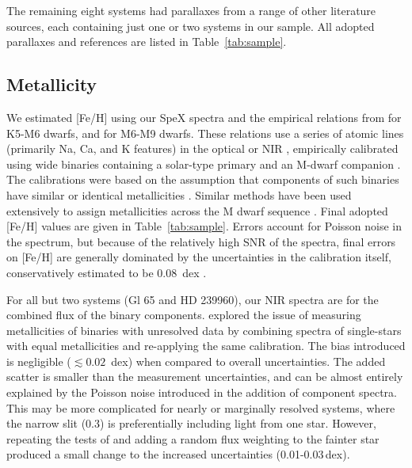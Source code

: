 \documentclass[twocolumn]{aastex62}
\begin{document}
The remaining eight systems had parallaxes from a range of other literature sources, each containing just one or two systems in our sample. All adopted parallaxes and references are listed in Table~\ref{tab:sample}.

\subsection{Metallicity}\label{sec:feh}

We estimated [Fe/H] using our SpeX spectra and the empirical relations from \citet{Mann2013a} for K5-M6 dwarfs, and \citet{Mann2014} for M6-M9 dwarfs. These relations use a series of atomic lines (primarily Na, Ca, and K features) in the optical or NIR \citep[e.g.,][]{2010ApJ...720L.113R,Terrien:2012lr}, empirically calibrated using wide binaries containing a solar-type primary and an M-dwarf companion \citep[e.g.,][]{2005A&A...442..635B,Johnson2009,Neves2012}. The calibrations were based on the assumption that components of such binaries have similar or identical metallicities \citep[e.g.,][]{2015ApJ...801L..10T}. Similar methods have been used extensively to assign metallicities across the M dwarf sequence \citep[e.g.,][]{Terrien2015,Muirhead2015,Dressing2017,2018ApJ...853...30V,2018ApJ...854..145M}. Final adopted [Fe/H] values are given in Table~\ref{tab:sample}. Errors account for Poisson noise in the spectrum, but because of the relatively high SNR of the spectra, final errors on [Fe/H] are generally dominated by the uncertainties in the calibration itself, conservatively estimated to be 0.08~dex \citep{Mann2013a,Mann2014}.

For all but two systems (Gl 65 and HD 239960), our NIR spectra are for the combined flux of the binary components. \citet{Mann2014} explored the issue of measuring metallicities of binaries with unresolved data by combining spectra of single-stars with equal metallicities and re-applying the same calibration. The bias introduced is negligible ($\lesssim0.02$~dex) when compared to overall uncertainties. The added scatter is smaller than the measurement uncertainties, and can be almost entirely explained by the Poisson noise introduced in the addition of component spectra. This may be more complicated for nearly or marginally resolved systems, where the narrow slit (0.3\arcsec) is preferentially including light from one star. However, repeating the tests of \citet{Mann2014} and adding a random flux weighting to the fainter star produced a small change to the increased uncertainties (0.01-0.03\,dex).
\end{document}
